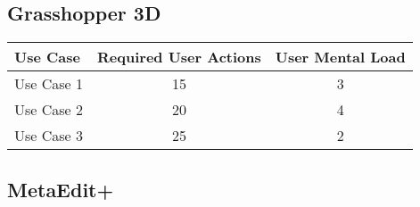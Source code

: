 \subsection{Grasshopper 3D}




\begin{tabularx}{\textwidth}{Xcc}
\textbf{Use Case} & \textbf{Required User Actions} & \textbf{User Mental Load}\\
\hline
Use Case 1                          & 15 & 3 \\
Use Case 2                          & 20 & 4 \\
Use Case 3                          & 25 & 2
\end{tabularx}

\subsection{MetaEdit+}




